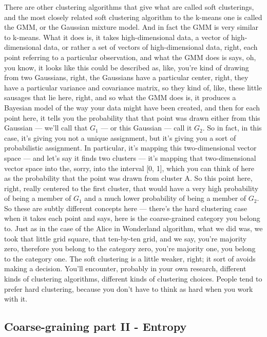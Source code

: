 \documentclass[]{article}
\begin{document}
There are other clustering algorithms
that give what are called soft clusterings,
and the most closely related
soft clustering algorithm to the
k-means one is called the GMM,
or the Gaussian mixture model.
And in fact the GMM is very similar
to k-means. What it does is, it takes
high-dimensional data, a vector of
high-dimensional data, or rather a set
of vectors of high-dimensional data,
right, each point referring to
a particular observation, and what the GMM
does is says, oh, you know, it looks like
this could be described as, like,
you're kind of drawing from two
Gaussians, right, the Gaussians
have a particular center, right,
they have a particular variance
and covariance matrix,
so they kind of, like,
these little sausages that lie here,
right,  and so what the GMM does is,
it produces a Bayesian model
of the way your data might have been
created,  and then for each point here,
it tells you the probability that that point
was drawn either from this Gaussian ---
we'll call that $G_1$ --- or this
Gaussian --- call it $G_2$.
So in fact, in this case, it's giving you
not a unique assignment, but it's
giving you a sort of probabilistic
assignment. In particular, it's mapping
this two-dimensional vector space ---
and let's say it finds two clusters ---
it's mapping that two-dimensional
vector space into the, sorry,
into the interval [0, 1], which you can
think of here as the probability
that the point was drawn from cluster A.
So this point here, right, really centered
to the first cluster, that would have a
very high probability of being a member
of $G_1$ and a much lower probability of
being a member of $G_2$.
So these are subtly different concepts
here --- there's the hard clustering case
when it takes each point and says, 
here is the coarse-grained category
you belong to. Just as in the case of the
Alice in Wonderland algorithm, what
we did was, we took that little
grid square, that ten-by-ten grid,
and we say,  you're majority zero,
therefore you belong to
the category zero, you're majority one,
you belong to the category one.
The soft clustering is a little weaker,
right; it sort of avoids
making a decision. You'll encounter,
probably in your own research,
different kinds of clustering algorithms,
different kinds of clustering choices.
People tend to prefer hard clustering,
because you don't have to think as hard
when you work with it.

\subsection{Coarse-graining part II - Entropy}
\end{document}

